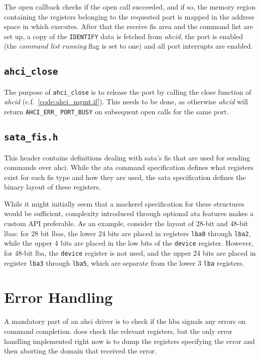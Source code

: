 The open callback checks if the open call succeeded, and if so, the memory
region containing the registers belonging to the requested port is mapped in
the address space in which \libahci executes. After that the receive \ac{fis}
area and the command list are set up, a copy of the \texttt{IDENTIFY} data is
fetched from \emph{ahcid}, the port is enabled (the \emph{command list running}
flag is set to one) and all port interrupts are enabled.

\subsection[ahci\_close]{\lstinline+ahci_close+}

The purpose of \lstinline+ahci_close+ is to release the port by calling the
close function of \emph{ahcid} (c.f.~\autoref{code:ahci_mgmt.if}). This needs
to be done, as otherwise \emph{ahcid} will return \verb+AHCI_ERR_+
\verb+PORT_BUSY+ on subsequent open calls for the same port.

\subsection[sata\_fis.h]{\lstinline+sata_fis.h+}

This header contains definitions dealing with \ac{sata}'s \ac{fis} that are
used for sending commands over \ac{ahci}. While the \ac{ata} command
specification defines what registers exist for each \ac{fis} type and how they
are used, the \ac{sata} specification defines the binary layout of these
registers.

While it might initially seem that a mackerel specification for these
structures would be sufficient, complexity introduced through optional \ac{ata}
features makes a custom API preferable. As an example, consider the layout of
28-bit and 48-bit \acp{lba}: for 28 bit \acp{lba}, the lower 24 bits are placed
in registers \verb+lba0+ through \verb+lba2+, while the upper 4 bits are placed
in the low bits of the \verb+device+ register. However, for 48-bit \ac{lba},
the \verb+device+ register is not used, and the upper 24 bits are placed in
register \verb+lba3+ through \verb+lba5+, which are separate from the lower 3
\verb+lba+ registers.

\section{Error Handling}

A mandatory part of an \ac{ahci} driver is to check if the \ac{hba} signals any
errors on command completion. \libahci does check the relevant registers, but
the only error handling implemented right now is to dump the registers
specifying the error and then aborting the domain that received the error.

